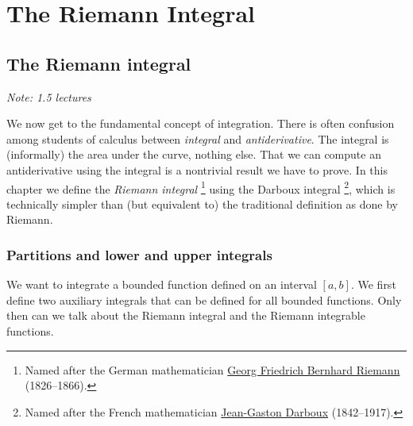 \documentclass[12pt]{book}
\newcommand{\sectionnotes}[1]{\noindent \emph{Note: #1} \medskip \par}
\theoremstyle{plain}
\theoremstyle{remark}
\theoremstyle{definition}
\theoremstyle{exercise}
\theoremstyle{example}
\begin{document}
\chapter{The Riemann Integral} \label{int:chapter}


\section{The Riemann integral}
\label{sec:rint}

\sectionnotes{1.5 lectures}

We now get to the fundamental concept of integration.  There is
often confusion among students of
calculus between \emph{integral} and \emph{antiderivative}.
The integral is (informally) the area under the curve, nothing else.
That we can compute an antiderivative using the integral is a nontrivial
result we have to prove.  
In this chapter we define the \emph{Riemann integral}%
\footnote{Named after the German mathematician
\href{http://en.wikipedia.org/wiki/Riemann}{Georg Friedrich Bernhard Riemann}
(1826--1866).}
using the Darboux integral%
\footnote{Named after the French mathematician
\href{http://en.wikipedia.org/wiki/Darboux}{Jean-Gaston Darboux} (1842--1917).},
which is technically simpler than (but equivalent to) the traditional
definition as done by Riemann.

\subsection{Partitions and lower and upper integrals}

We want to integrate a bounded function defined on an interval $[a,b]$.
We first define two auxiliary integrals that can be defined for all
bounded functions.  Only then can we talk about the Riemann integral and
the Riemann integrable functions.
\end{document}
